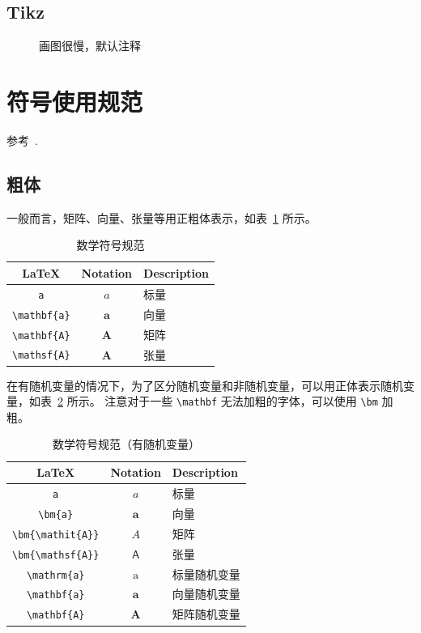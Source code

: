 \documentclass[11pt,a4paper,UTF8]{ctexart}
\begin{document}
\subsection{Tikz}
\begin{figure}[h]
    \centering
    
    \caption{画图很慢，默认注释}
    \label{fig:my_label}
\end{figure}

\newpage
\section{符号使用规范}
参考~\cite{downes2017short,ZhangHao2017}.

\subsection{粗体}
一般而言，矩阵、向量、张量等用正粗体表示，如表~\ref{tab:math1} 所示。
\begin{table}[htbp]
    \centering
    \begin{tabular}{c c l}
        \toprule
        \LaTeX & Notation & Description   \\
        \midrule 
        \verb|a| & $a$ & 标量\\ 
        \verb|\mathbf{a}| & $\mathbf{a}$ & 向量 \\
        \verb|\mathbf{A}| & $\mathbf{A}$ & 矩阵 \\
        \verb|\mathsf{A}| & $\mathbf{A}$ & 张量 \\\bottomrule
    \end{tabular}
    \caption{数学符号规范}
    \label{tab:math1}
\end{table}

在有随机变量的情况下，为了区分随机变量和非随机变量，可以用正体表示随机变量，如表~\ref{tab:math2} 所示。
注意对于一些 \verb|\mathbf| 无法加粗的字体，可以使用 \verb|\bm| 加粗。

\begin{table}[htbp]
    \centering
    \begin{tabular}{c c l}
        \toprule
        \LaTeX & Notation & Description   \\
        \midrule 
        \verb|a| & $a$ & 标量 \\ 
        \verb|\bm{a}| & $\bm{a}$ & 向量 \\
        \verb|\bm{\mathit{A}}| & $\bm{\mathit{A}}$ & 矩阵 \\
        \verb|\bm{\mathsf{A}}| & $\bm{\mathsf{A}} $ & 张量 \\
        \verb|\mathrm{a}| & $\mathrm{a}$ & 标量随机变量 \\
        \verb|\mathbf{a}| & $\mathbf{a}$ & 向量随机变量 \\
        \verb|\mathbf{A}| & $\mathbf{A}$ & 矩阵随机变量 \\\bottomrule
    \end{tabular}
    \caption{数学符号规范（有随机变量）}
    \label{tab:math2}
\end{table}
 
\end{document}
